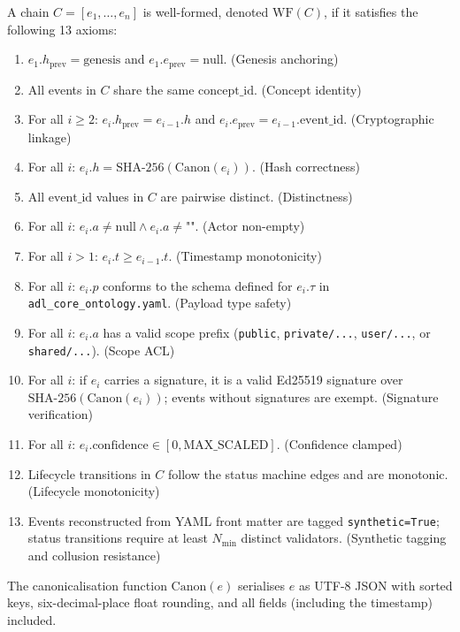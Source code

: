 A chain $C = [e_1, \ldots, e_n]$ is well-formed, denoted $\text{WF}(C)$, if it satisfies the following 13 axioms:
\begin{enumerate}[label=(\arabic*)]
    \item $e_1.h_{\text{prev}} = \text{genesis}$ and $e_1.e_{\text{prev}} = \text{null}$. (Genesis anchoring)
    \item All events in $C$ share the same $\text{concept\_id}$. (Concept identity)
    \item For all $i \geq 2$: $e_i.h_{\text{prev}} = e_{i-1}.h$ and $e_i.e_{\text{prev}} = e_{i-1}.\text{event\_id}$. (Cryptographic linkage)
    \item For all $i$: $e_i.h = \text{SHA-256}(\text{Canon}(e_i))$. (Hash correctness)
    \item All $\text{event\_id}$ values in $C$ are pairwise distinct. (Distinctness)
    \item For all $i$: $e_i.a \neq \text{null} \land e_i.a \neq \text{""}$. (Actor non-empty)
    \item For all $i > 1$: $e_i.t \geq e_{i-1}.t$. (Timestamp monotonicity)
    \item For all $i$: $e_i.p$ conforms to the schema defined for $e_i.\tau$ in \texttt{adl\_core\_ontology.yaml}. (Payload type safety)
    \item For all $i$: $e_i.a$ has a valid scope prefix (\texttt{public}, \texttt{private/...}, \texttt{user/...}, or \texttt{shared/...}). (Scope ACL)
    \item For all $i$: if $e_i$ carries a signature, it is a valid Ed25519 signature over $\text{SHA-256}(\text{Canon}(e_i))$; events without signatures are exempt. (Signature verification)
    \item For all $i$: $e_i.\text{confidence} \in [0, \text{MAX\_SCALED}]$. (Confidence clamped)
    \item Lifecycle transitions in $C$ follow the status machine edges and are monotonic. (Lifecycle monotonicity)
    \item Events reconstructed from YAML front matter are tagged \texttt{synthetic=True}; status transitions require at least $N_{\min}$ distinct validators. (Synthetic tagging and collusion resistance)
\end{enumerate}

The canonicalisation function $\text{Canon}(e)$ serialises $e$ as UTF-8 JSON with sorted keys, six-decimal-place float rounding, and all fields (including the timestamp) included.


